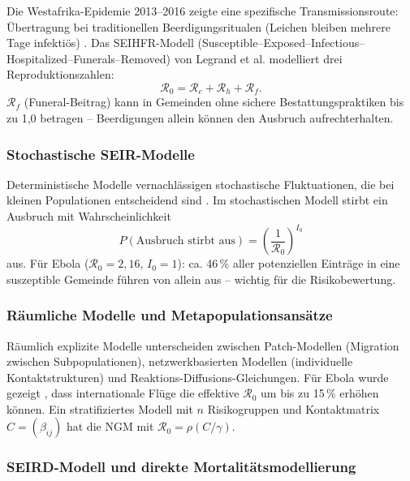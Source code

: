 ﻿\documentclass[12pt,a4paper]{article}
\theoremstyle{definition}
\theoremstyle{plain}
\theoremstyle{remark}
\begin{document}
Die Westafrika-Epidemie 2013--2016 zeigte eine spezifische Transmissionsroute:
Übertragung bei traditionellen Beerdigungsritualen (Leichen bleiben mehrere Tage
infektiös) \cite{faye2015}. Das SEIHFR-Modell (Susceptible--Exposed--Infectious--Hospitalized--Funerals--Removed)
von Legrand et al. \cite{legrand2007} modelliert drei Reproduktionszahlen:
\[
  \mathcal{R}_0 = \mathcal{R}_c + \mathcal{R}_h + \mathcal{R}_f.
\]
$\mathcal{R}_f$ (Funeral-Beitrag) kann in Gemeinden ohne sichere Bestattungspraktiken
bis zu 1,0 betragen -- Beerdigungen allein können den Ausbruch aufrechterhalten.

\subsubsection{Stochastische SEIR-Modelle}

Deterministische Modelle vernachlässigen stochastische Fluktuationen, die bei
kleinen Populationen entscheidend sind \cite{allen2017}. Im stochastischen Modell
stirbt ein Ausbruch mit Wahrscheinlichkeit
\[
  P(\text{Ausbruch stirbt aus}) = \left(\frac{1}{\mathcal{R}_0}\right)^{I_0}
\]
aus. Für Ebola ($\mathcal{R}_0 = 2{,}16$, $I_0 = 1$): ca. 46\,\% aller potenziellen
Einträge in eine suszeptible Gemeinde führen von allein aus -- wichtig für die Risikobewertung.

\subsubsection{Räumliche Modelle und Metapopulationsansätze}

Räumlich explizite Modelle unterscheiden zwischen Patch-Modellen (Migration zwischen
Subpopulationen), netzwerkbasierten Modellen (individuelle Kontaktstrukturen) und
Reaktions-Diffusions-Gleichungen. Für Ebola wurde gezeigt \cite{gomes2014}, dass
internationale Flüge die effektive $\mathcal{R}_0$ um bis zu 15\,\% erhöhen können.
Ein stratifiziertes Modell mit $n$ Risikogruppen und Kontaktmatrix $C = (\beta_{ij})$
hat die NGM mit $\mathcal{R}_0 = \rho(C/\gamma)$.

\subsubsection{SEIRD-Modell und direkte Mortalitätsmodellierung}
\end{document}
